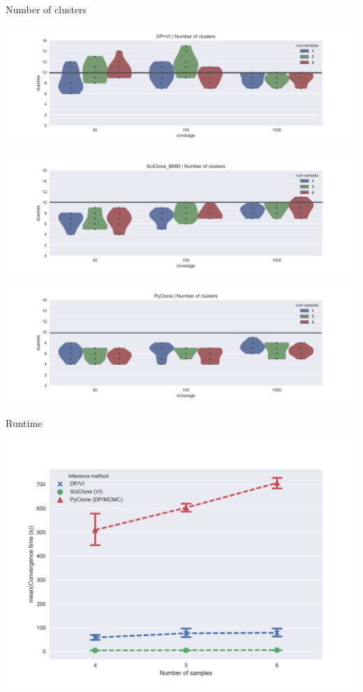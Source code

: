 \documentclass{beamer}
\begin{document}
\begin{frame}{Number of clusters}
\vspace{-0.05in}
\centerline{\includegraphics[scale=0.27]{images/DPVI_num_clusters.png}}
\vspace{-0.05in}
\centerline{\includegraphics[scale=0.27]{images/SciClone_num_clusters.png}}
\vspace{-0.05in}
\centerline{\includegraphics[scale=0.27]{images/PyClone_num_clusters.png}}
\end{frame}

\begin{frame}{Runtime}
\centerline{\includegraphics[scale=0.5]{images/time_comparisons.png}}
\end{frame}
\end{document}

